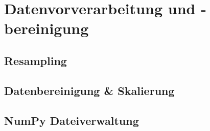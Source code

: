 \section{Datenvorverarbeitung und -bereinigung}

\subsection{Resampling}



\subsection{Datenbereinigung \& Skalierung}


\subsection{NumPy Dateiverwaltung}
